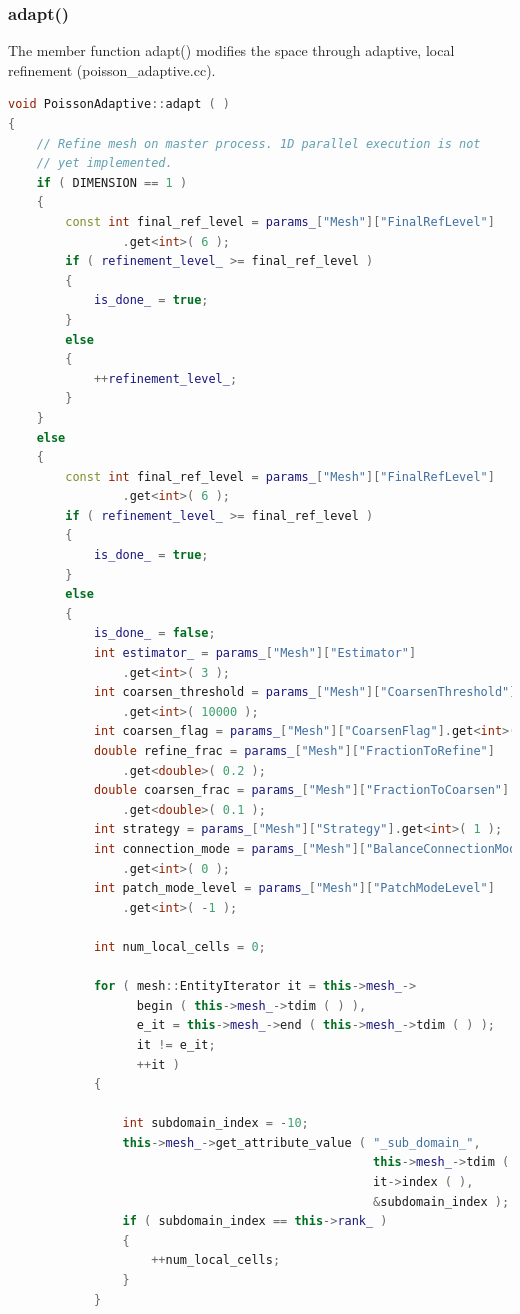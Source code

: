 \documentclass[a4paper, 11pt, twoside]{article}
\begin{document}
\subsubsection{adapt()}\label{adapt}
The member function adapt() modifies the space through adaptive, local refinement (poisson\_adaptive.cc). 

\begin{lstlisting}[language=C++, basicstyle={\footnotesize, \ttfamily}, keywordstyle=\color{blue}, numbers=none, tabsize=4]
void PoissonAdaptive::adapt ( )
{
    // Refine mesh on master process. 1D parallel execution is not
    // yet implemented.
    if ( DIMENSION == 1 )
    {
        const int final_ref_level = params_["Mesh"]["FinalRefLevel"]
                .get<int>( 6 );
        if ( refinement_level_ >= final_ref_level )
        {
            is_done_ = true;
        }
        else
        {
            ++refinement_level_;
        }
    }
    else
    {
        const int final_ref_level = params_["Mesh"]["FinalRefLevel"]
                .get<int>( 6 );
        if ( refinement_level_ >= final_ref_level )
        {
            is_done_ = true;
        }
        else
        {
            is_done_ = false;
            int estimator_ = params_["Mesh"]["Estimator"]
                .get<int>( 3 );
            int coarsen_threshold = params_["Mesh"]["CoarsenThreshold"]
                .get<int>( 10000 );
            int coarsen_flag = params_["Mesh"]["CoarsenFlag"].get<int>( 1 );
            double refine_frac = params_["Mesh"]["FractionToRefine"]
                .get<double>( 0.2 );
            double coarsen_frac = params_["Mesh"]["FractionToCoarsen"]
                .get<double>( 0.1 );
            int strategy = params_["Mesh"]["Strategy"].get<int>( 1 );
            int connection_mode = params_["Mesh"]["BalanceConnectionMode"]
                .get<int>( 0 );
            int patch_mode_level = params_["Mesh"]["PatchModeLevel"]
                .get<int>( -1 );

            int num_local_cells = 0;

            for ( mesh::EntityIterator it = this->mesh_->
                  begin ( this->mesh_->tdim ( ) ),
                  e_it = this->mesh_->end ( this->mesh_->tdim ( ) );
                  it != e_it;
                  ++it )
            {

                int subdomain_index = -10;
                this->mesh_->get_attribute_value ( "_sub_domain_", 
                                                   this->mesh_->tdim ( ), 
                                                   it->index ( ), 
                                                   &subdomain_index );
                if ( subdomain_index == this->rank_ )
                {
                    ++num_local_cells;
                }
            }


\end{lstlisting}
\end{document}
